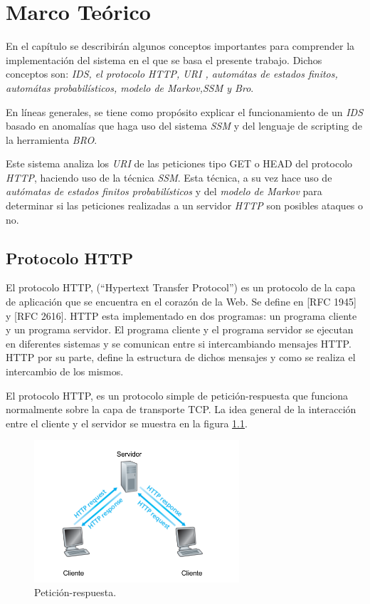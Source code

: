 \chapter{Marco Teórico}
\label{capitulo2}


En el cap\'itulo se describir\'an algunos conceptos importantes para comprender la implementaci\'on del sistema  en el que se basa el presente trabajo. Dichos conceptos son: \textit{IDS, el protocolo HTTP, URI , autom\'atas de estados finitos, autom\'atas probabilísticos, modelo de Markov,SSM y Bro}.

En l\'ineas generales, se tiene como prop\'osito explicar el funcionamiento de un \textit{IDS} basado en anomalías que haga uso del sistema \textit{SSM} y del lenguaje de scripting de la herramienta \textit{BRO}.

Este sistema analiza los \textit{URI} de las peticiones tipo GET o HEAD del protocolo \textit{HTTP}, haciendo uso de la t\'ecnica \textit{SSM}. Esta t\'ecnica, a su vez hace uso de \textit{autómatas de estados finitos probabilísticos} y del \textit{modelo de Markov} para determinar si las peticiones realizadas a un servidor \textit{HTTP} son posibles ataques o no.

\section{Protocolo HTTP}

El protocolo HTTP, (``Hypertext Transfer Protocol'') es un protocolo de la capa de aplicación que se encuentra en el corazón de la Web. Se define en [RFC 1945] y [RFC 2616]. HTTP esta implementado en dos programas: un programa cliente y un programa servidor. El programa cliente y el programa servidor se ejecutan en diferentes sistemas y se comunican entre si intercambiando mensajes HTTP. HTTP por su parte, define la estructura de dichos mensajes y como se realiza el intercambio de los mismos. \cite{httpKross}

El protocolo HTTP, es un protocolo simple de petición-respuesta que funciona normalmente sobre la capa de transporte TCP. La idea general de la interacción entre el cliente y el servidor se muestra en la figura \ref{fig:httpPeticionRespuesta}. 

\begin{figure}[tb]
\begin{center}
\includegraphics[width=3in]{./img/HTTP.png}
\caption{Petición-respuesta.\cite{httpKross}}
\label{fig:httpPeticionRespuesta}
\end{center}
\end{figure}

